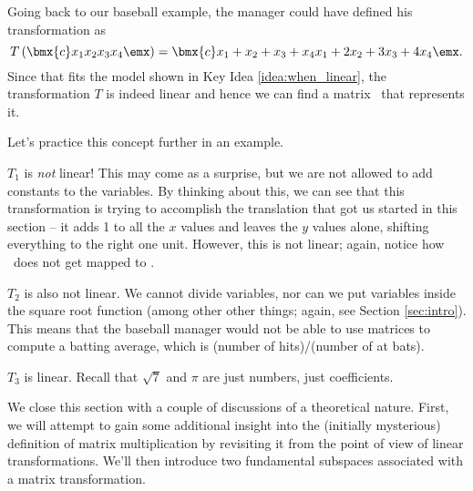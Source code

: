 \smallskip

Going back to our baseball example, the manager could have defined his transformation as 
\[
T\left(\bmx{c}x_1\\x_2\\x_3\\x_4\emx\right) = \bmx{c}x_1+x_2+x_3+x_4 \\ x_1+2x_2+3x_3+4x_4\emx.
\]
Since that fits the model shown in Key Idea \ref{idea:when_linear}, the transformation $T$ is indeed linear and hence we can find a matrix \TT\ that represents it.

Let's practice this concept further in an example.

\medskip

{$T_1$ is \textit{not} linear! This may come as a surprise, but we are not allowed to add constants to the variables. By thinking about this, we can see that this transformation is trying to accomplish the translation that got us started in this section -- it adds 1 to all the $x$ values and leaves the $y$ values alone, shifting everything to the right one unit. However, this is not linear; again, notice how \zero\ does not get mapped to \zero.

$T_2$ is also not linear. We cannot divide variables, nor can we put variables inside the square root function (among other other things; again, see Section \ref{sec:intro}). This means that the baseball manager would not be able to use matrices to compute a batting average, which is (number of hits)/(number of at bats).

$T_3$ is linear. Recall that $\sqrt{7}$ and $\pi$ are just numbers, just coefficients.
}

\medskip

We close this section with a couple of discussions of a theoretical nature. First, we will attempt to gain some additional insight into the (initially mysterious) definition of matrix multiplication by revisiting it from the point of view of linear transformations. We'll then introduce two fundamental subspaces associated with a matrix transformation.

